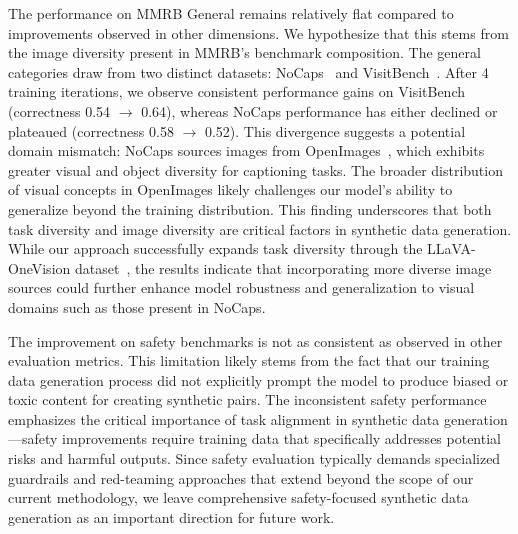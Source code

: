  The performance on MMRB General remains relatively flat compared to improvements observed in other dimensions. We hypothesize that this stems from the image diversity present in MMRB's benchmark composition. The general categories draw from two distinct datasets: NoCaps~\cite{agrawal2019nocaps} and VisitBench~\cite{bitton2023visit}. After 4 training iterations, we observe consistent performance gains on VisitBench (correctness 0.54 $\rightarrow$ 0.64), whereas NoCaps performance has either declined or plateaued (correctness 0.58 $\rightarrow$ 0.52). This divergence suggests a potential domain mismatch: NoCaps sources images from OpenImages~\cite{kuznetsova2020open}, which exhibits greater visual and object diversity for captioning tasks. The broader distribution of visual concepts in OpenImages likely challenges our model's ability to generalize beyond the training distribution. This finding underscores that both task diversity and image diversity are critical factors in synthetic data generation. While our approach successfully expands task diversity through the LLaVA-OneVision dataset~\cite{li2024llavaonevisioneasyvisualtask}, the results indicate that incorporating more diverse image sources could further enhance model robustness and generalization to visual domains such as those present in NoCaps.


 The improvement on safety benchmarks is not as consistent as observed in other evaluation metrics. This limitation likely stems from the fact that our training data generation process did not explicitly prompt the model to produce biased or toxic content for creating synthetic pairs. The inconsistent safety performance emphasizes the critical importance of task alignment in synthetic data generation—safety improvements require training data that specifically addresses potential risks and harmful outputs. Since safety evaluation typically demands specialized guardrails and red-teaming approaches that extend beyond the scope of our current methodology, we leave comprehensive safety-focused synthetic data generation as an important direction for future work.

